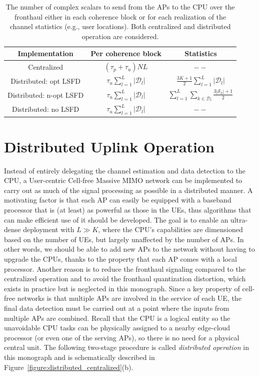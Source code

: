 \begin{table}[t]  
	\caption{The number of complex scalars to send from the  APs  to the CPU over the fronthaul either in each coherence block or for each realization of the channel statistics (e.g., user locations). Both centralized and distributed operation are considered.}  \label{tab:signaling-level4-level3}
	\centering
	\begin{tabular}{|c|c|c|} 
		\hline
		{Implementation} & {Per coherence block}&{Statistics}    \\      \hline\hline 
		
		Centralized &   $(\tau_p+\tau_u) NL$  & $ --$     \\ \hline    
		Distributed: opt LSFD &   $\tau_u \sum\limits_{l=1}^L |\mathcal{D}_l|$  & $ \frac{3K+1}{2}\sum\limits_{l=1}^{L} |\mathcal{D}_l|$     \\ \hline   
				Distributed: n-opt LSFD &   $\tau_u \sum\limits_{l=1}^L |\mathcal{D}_l|$  & $\sum\limits_{l=1}^{L} \sum\limits_{k \in \mathcal{D}_l} \frac{3|\mathcal{S}_k|+1}{2}$  \\ \hline   
				Distributed: no LSFD &   $\tau_u \sum\limits_{l=1}^L |\mathcal{D}_l|$  & $ --$  \\ \hline  
	\end{tabular}
\end{table}

\enlargethispage{\baselineskip} 

\section{Distributed Uplink Operation}
\label{sec:level3-uplink}

Instead of entirely delegating the channel estimation and data detection to the CPU, a User-centric Cell-free Massive MIMO network can be implemented to carry out as much of the signal processing as possible in a distributed manner.
A motivating factor is that each AP can easily be equipped with a baseband processor that is (at least) as powerful as those in the UEs, thus algorithms that can make efficient use of it should be developed. The goal is to enable an ultra-dense deployment with $L \gg K$, where the CPU's capabilities are dimensioned based on the number of UEs, but largely unaffected by the number of APs. In other words, we should be able to add new APs to the network without having to upgrade the CPUs, thanks to the property that each AP comes with a local processor.
Another reason is to reduce the fronthaul signaling compared to the centralized operation and to avoid the fronthaul quantization distortion, which exists in practice but is neglected in this monograph.
Since a key property of cell-free networks is that multiple APs are involved in the service of each UE, the final data detection must be carried out at a point where the inputs from multiple APs are combined. Recall that the CPU is a logical entity so the unavoidable CPU tasks can be physically assigned to a nearby edge-cloud processor (or even one of the serving APs), so there is no need for a physical central unit.
The following two-stage procedure is called \emph{distributed operation} in this monograph and is schematically described in Figure~\ref{figure:distributed_centralized}(b).

